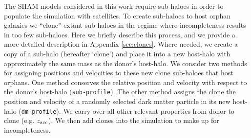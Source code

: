 \documentclass[a4paper,fleqn,usenatbib]{mnras}
\begin{document}
%
%

The SHAM models considered in this work require sub-haloes in order to populate the simulation with satellites.  To create sub-haloes to host orphan galaxies we ``clone'' extant sub-haloes in the regime where incompleteness results in too few sub-haloes.  Here we briefly describe this process, and we provide a more detailed description in Appendix \ref{sec:clones}.  Where needed, we create a copy of a sub-halo (hereafter `clone') and place it into a new host-halo with approximately the same mass as the donor's host-halo.  We consider two methods for assigning positions and velocities to these new clone sub-haloes that host orphans.  One method conserves the relative position and velocity with respect to the donor's host-halo ({\tt sub-profile}).  The other method assigns the clone the position and velocity of a randomly selected dark matter particle in its new host-halo ({\tt dm-profile}).  We carry over all other relevant properties from donor to clone (e.g. $z_{\rm acc}$).  We then add clones into the simulation to make up for incompleteness.
\end{document}

